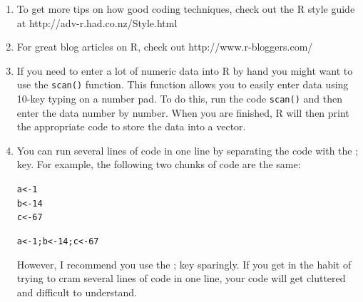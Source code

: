 \documentclass{tufte-book}\usepackage[]{graphicx}\usepackage[]{color}
\makeatletter
\newcommand{\hlnum}[1]{\textcolor[rgb]{0.686,0.059,0.569}{#1}}%
\newcommand{\hlstd}[1]{\textcolor[rgb]{0.345,0.345,0.345}{#1}}%
\newcommand{\hlkwb}[1]{\textcolor[rgb]{0.69,0.353,0.396}{#1}}%
\newenvironment{kframe}{%
 \def\at@end@of@kframe{}%
 \ifinner\ifhmode%
  \def\at@end@of@kframe{\end{minipage}}%
  \begin{minipage}{\columnwidth}%
 \fi\fi%
 \def\FrameCommand##1{\hskip\@totalleftmargin \hskip-\fboxsep
 \colorbox{shadecolor}{##1}\hskip-\fboxsep
     \hskip-\linewidth \hskip-\@totalleftmargin \hskip\columnwidth}%
 \MakeFramed {\advance\hsize-\width
   \@totalleftmargin\z@ \linewidth\hsize
   \@setminipage}}%
 {\par\unskip\endMakeFramed%
 \at@end@of@kframe}
\newenvironment{knitrout}{}{} %
\makeatother
\begin{document}
\begin{enumerate}
  \item To get more tips on how good coding techniques, check out the R style guide at http://adv-r.had.co.nz/Style.html
  \item For great blog articles on R, check out http://www.r-bloggers.com/
  \item If you need to enter a lot of numeric data into R by hand you might want to use the \texttt{scan()} function. This function allows you to easily enter data using 10-key typing on a number pad. To do this, run the code \texttt{scan()} and then enter the data number by number. When you are finished, R will then print the appropriate code to store the data into a vector.
  \item You can run several lines of code in one line by separating the code with the ; key. For example, the following two chunks of code are the same:
  
\begin{knitrout}
\color{fgcolor}\begin{kframe}
\begin{alltt}
\hlstd{a} \hlkwb{<-} \hlnum{1}
\hlstd{b} \hlkwb{<-} \hlnum{14}
\hlstd{c} \hlkwb{<-} \hlnum{67}
\end{alltt}
\end{kframe}
\end{knitrout}

\begin{knitrout}
\color{fgcolor}\begin{kframe}
\begin{alltt}
\hlstd{a} \hlkwb{<-} \hlnum{1} \hlstd{; b} \hlkwb{<-} \hlnum{14} \hlstd{; c} \hlkwb{<-} \hlnum{67}
\end{alltt}
\end{kframe}
\end{knitrout}

  
  However, I recommend you use the ; key sparingly. If you get in the habit of trying to cram several lines of code in one line, your code will get cluttered and difficult to understand.

\end{enumerate}


\end{document}
